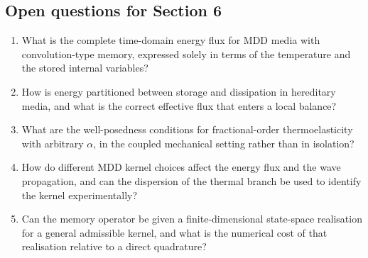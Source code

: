 \subsection{Open questions for Section 6}

\begin{enumerate}[label=\textbf{OQ6.\arabic*}]
\item What is the complete time-domain energy flux for MDD media with convolution-type memory, expressed solely in terms of the temperature and the stored internal variables? \\ \label{oq:6.1}
\item How is energy partitioned between storage and dissipation in hereditary media, and what is the correct effective flux that enters a local balance? \\ \label{oq:6.2}
\item What are the well-posedness conditions for fractional-order thermoelasticity with arbitrary $\alpha$, in the coupled mechanical setting rather than in isolation? \\ \label{oq:6.3}
\item How do different MDD kernel choices affect the energy flux and the wave propagation, and can the dispersion of the thermal branch be used to identify the kernel experimentally? \\ \label{oq:6.4}
\item Can the memory operator be given a finite-dimensional state-space realisation for a general admissible kernel, and what is the numerical cost of that realisation relative to a direct quadrature? \\ \label{oq:6.5}
\end{enumerate}

